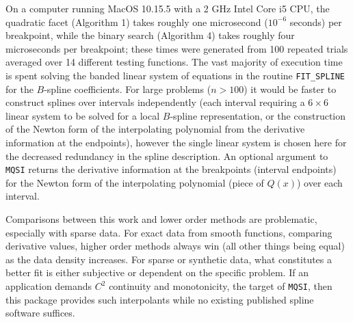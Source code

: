 On a computer running MacOS 10.15.5 with a 2 GHz Intel Core i5 CPU, the
quadratic facet (Algorithm 1) takes roughly one microsecond ($10^{-6}$
seconds) per breakpoint, while the binary search (Algorithm 4) takes roughly
four microseconds per breakpoint; these times were generated from 100
repeated trials averaged over 14 different testing functions.  The vast
majority of execution time is spent solving the banded linear system of
equations in the routine {\tt FIT\_SPLINE} for the $B$-spline coefficients.
For large problems ($n > 100$) it would be faster to construct splines
over intervals independently (each interval requiring a $6 \times 6$ linear
system to be solved for a local $B$-spline representation, or the
construction of the Newton form of the interpolating polynomial from the
derivative information at the endpoints), however the single linear system
is chosen here for the decreased redundancy in the spline description. An
optional argument to {\tt MQSI} returns the derivative information at the
breakpoints (interval endpoints) for the Newton form of the interpolating
polynomial (piece of $Q(x)$) over each interval.

Comparisons between this work and lower order methods are problematic,
especially with sparse data. For exact data from smooth functions,
comparing derivative values, higher order methods always win (all
other things being equal) as the data density increases. For sparse or
synthetic data, what constitutes a better fit is either subjective or
dependent on the specific problem. If an application demands $C^2$
continuity and monotonicity, the target of {\tt MQSI}, then this
package provides such interpolants while no existing published spline
software suffices.
